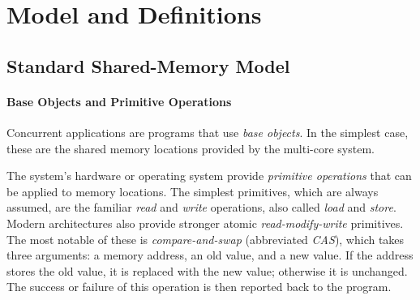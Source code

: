 
\section{Model and Definitions}
\label{section: Model}

\subsection{Standard Shared-Memory Model}

\paragraph{Base Objects and Primitive Operations}
Concurrent applications are programs that use \emph{base objects}.
In the simplest case, these are the shared memory locations provided by the multi-core system.

The system's hardware or operating system provide \emph{primitive operations} that can be applied to memory locations. The simplest primitives, which are always assumed,
are the familiar \emph{read} and \emph{write} operations,
also called \emph{load} and \emph{store}.
Modern architectures also provide stronger atomic \emph{read-modify-write} primitives. The most notable of these is \emph{compare-and-swap} (abbreviated \textit{CAS}), which takes three arguments: a memory address, an old value, and a new value. If the address stores the old value, it is replaced with the new value; otherwise it is unchanged. The success or failure of this operation is then reported back to the program.
%
%

